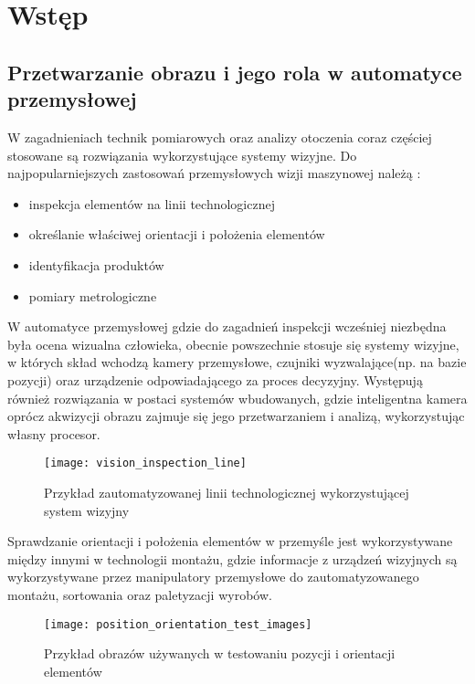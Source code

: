 \documentclass[document.tex]{subfiles}
\begin{document}
\chapter{Wstęp}

\section{Przetwarzanie obrazu i jego rola w automatyce przemysłowej}
	\indent W zagadnieniach technik pomiarowych oraz analizy otoczenia coraz częściej stosowane
	są rozwiązania wykorzystujące systemy wizyjne. Do najpopularniejszych zastosowań przemysłowych wizji maszynowej należą \cite{Machine_Vision_Intro}:
	\begin{itemize}
		\item inspekcja elementów na linii technologicznej
		\item określanie właściwej orientacji i położenia elementów
		\item identyfikacja produktów
		\item pomiary metrologiczne		
	\end{itemize}
	\indent W automatyce przemysłowej gdzie do zagadnień inspekcji
	wcześniej niezbędna była ocena wizualna człowieka, obecnie powszechnie stosuje się systemy wizyjne, 
	w których skład wchodzą kamery przemysłowe, czujniki wyzwalające(np. na bazie pozycji) oraz urządzenie odpowiadającego za proces decyzyjny.
	Występują również rozwiązania w postaci systemów wbudowanych, gdzie inteligentna kamera oprócz
	akwizycji obrazu zajmuje się jego przetwarzaniem i analizą, wykorzystując własny procesor.\cite{Machine_Vision_Intro}\cite{Davies_Machine_Vision}
\\
\begin{center}
	\begin{figure}[h]
	\texttt{[image: vision\_inspection\_line]}
	\caption{Przykład zautomatyzowanej linii technologicznej wykorzystującej system wizyjny\protect\cite{Vision_systems_article}}
	\label{fig:inspekcja}
	\end{figure}
\end{center}
\clearpage
	\indent Sprawdzanie orientacji i położenia elementów w przemyśle jest wykorzystywane
	między innymi w technologii montażu, gdzie informacje z urządzeń wizyjnych są wykorzystywane
	przez manipulatory przemysłowe do zautomatyzowanego montażu, sortowania oraz paletyzacji wyrobów.\cite{Machine_Vision_Intro}
\\
\begin{center}
	\begin{figure}[h]
	\texttt{[image: position\_orientation\_test\_images]}
	\caption{Przykład obrazów używanych w testowaniu pozycji i orientacji elementów\protect\cite{Machine_Vision_Intro}}
	\label{fig:pozycja_orientacja}
	\end{figure}	
\end{center}
\end{document}
